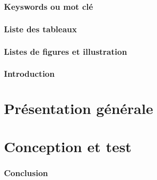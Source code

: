 \documentclass[12pt,a4paper]{report}
\begin{document}
\pagebreak


\begin{abstract}
	\lipsum[2]
\end{abstract}
\begin{abstract}
	\lipsum[2]
\end{abstract}


\section*{Keyswords ou mot clé}

\pagebreak
\section*{Liste des tableaux}

\pagebreak

\section*{Listes de figures et illustration}

\newpage 	
{}		
\pagestyle{fancy}


\newpage
\section*{Introduction}
\newpage

\part{Présentation générale}


%





\part{Conception et test}








\newpage
{}
\section*{Conclusion}
\newpage
%
%

			
\end{document}
